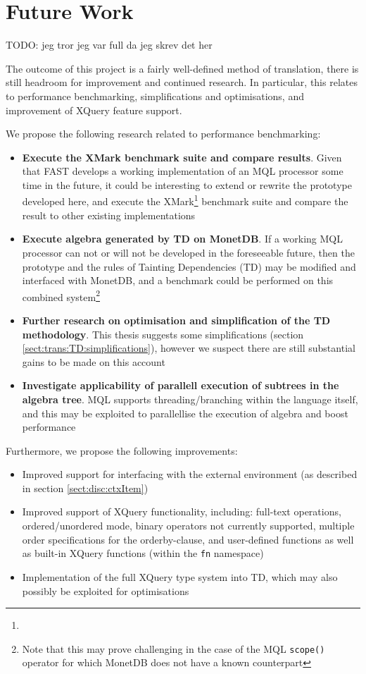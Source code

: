 \chapter{Future Work}
\label{chapter:future}

TODO: jeg tror jeg var full da jeg skrev det her

The outcome of this project is a fairly well-defined method of translation,
there is still headroom for improvement and continued research. In particular,
this relates to performance benchmarking, simplifications and optimisations,
and improvement of XQuery feature support.

We propose the following research related to performance benchmarking:
\begin{itemize}
  \item \textbf{Execute the XMark benchmark suite and compare results}. Given that FAST
  develops a working implementation of an MQL processor some time in the future, it could be interesting to extend or rewrite the
  prototype developed here, and execute the
  XMark\footnote{} 
  benchmark suite and compare the result to other existing implementations
  \item \textbf{Execute algebra generated by TD on MonetDB}. If a working MQL
  processor can not or will not be developed in the foreseeable future, then
  the prototype and the rules of Tainting Dependencies (TD) may be modified
  and interfaced with MonetDB, and a benchmark could be performed on this
  combined system\footnote{Note that this may prove challenging in the case of
  the MQL \texttt{scope()} operator for which MonetDB does not have a known counterpart}
  \item \textbf{Further research on optimisation and simplification of the TD
  methodology}. This thesis suggests some simplifications (section
  \ref{sect:trans:TD:simplifications}), however we suspect there are still
  substantial gains to be made on this account
  \item \textbf{Investigate applicability of parallell execution of subtrees in the
  algebra tree}. MQL supports threading/branching within the language itself,
  and this may be exploited to parallellise the execution of algebra and boost
  performance
\end{itemize}

Furthermore, we propose the following improvements:
\begin{itemize}
  \item Improved support for interfacing with the external environment (as
  described in section \ref{sect:disc:ctxItem})
  \item Improved support of XQuery functionality, including: full-text
  operations, ordered/unordered mode, binary operators not currently supported,
  multiple order specifications for the orderby-clause, and user-defined
  functions as well as built-in XQuery functions (within the \texttt{fn} namespace)
  \item Implementation of the full XQuery type system into TD, which may also
  possibly be exploited for optimisations
\end{itemize}
